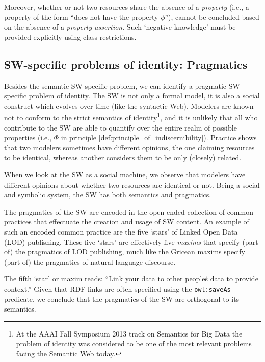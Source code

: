 Moreover, whether or not two resources share the absence of a \emph{property}
  (i.e., a property of the form ``does not have the property $\phi$''),
  cannot be concluded based on the absence of a \emph{property assertion}.
Such `negative knowledge' must be provided explicitly
  using class restrictions.

\subsection{SW-specific problems of identity: Pragmatics}

Besides the semantic SW-specific problem,
  we can identify a pragmatic SW-specific problem of identity.
The SW is not only a formal model,
  it is also a social construct which evolves over time
  (like the syntactic Web).
Modelers are known not to conform to
  the strict semantics of identity\footnote{
    At the AAAI Fall Symposium 2013 track on Semantics for Big Data
    the problem of identity was considered to be one of the most
    relevant problems facing the Semantic Web today.
  },
  and it is unlikely that all who contribute to the SW are able to
  quantify over the entire realm of possible properties
  (i.e., $\Phi$ in principle \ref{def:principle_of_indiscernibility}).
Practice shows that two modelers sometimes have different opinions,
  the one claiming resources to be identical,
  whereas another considers them to be only (closely) related.

When we look at the SW as a social machine\cite{TODO},
  we observe that modelers have different opinions about
  whether two resources are identical or not.
Being a social and symbolic system, the SW has both semantics and pragmatics.

The pragmatics of the SW are encoded in the open-ended collection of
  common practices that effectuate the creation and usage of SW content.
An example of such an encoded common practice are the five `stars'
  of Linked Open Data (LOD) publishing.\cite{TODO}
These five `stars' are effectively five \emph{maxims} that specify
  (part of) the pragmatics of LOD publishing,
  much like the Gricean maxims specify
  (part of) the pragmatics of natural language discourse.\cite{TODO}

The fifth `star' or maxim reads:
``Link your data to other people\'s data to provide context.''
Given that RDF links are often specified using
the \verb|owl:saveAs| predicate\cite{void},
we conclude that the pragmatics of the SW are orthogonal to its semantics.

